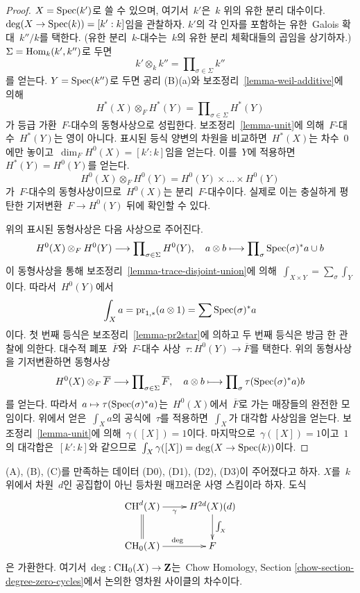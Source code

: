 \begin{proof}
$X = \mathop{\mathrm{Spec}}(k')$로 쓸 수 있으며, 여기서\  $k'$은\  $k$ 위의 유한 분리
대수이다. $\deg(X \to \mathop{\mathrm{Spec}}(k)) = [k' : k]$임을 관찰하자.
$k'$의 각 인자를 포함하는 유한\  Galois 확대\  $k''/k$를 택한다.
(유한 분리\  $k$-대수는\  $k$의 유한 분리 체확대들의 곱임을 상기하자.)
$\Sigma = \mathop{\mathrm{Hom}}\nolimits_k(k', k'')$로 두면
$$
k' \otimes_k k'' = \prod\nolimits_{\sigma \in \Sigma} k''
$$
를 얻는다. $Y = \mathop{\mathrm{Spec}}(k'')$로 두면 공리 (B)(a)와 보조정리\ 
\ref{lemma-weil-additive}에 의해
$$
H^*(X) \otimes_F H^*(Y) =
\prod\nolimits_{\sigma \in \Sigma} H^*(Y)
$$
가 등급 가환\  $F$-대수의 동형사상으로 성립한다. 보조정리\ 
\ref{lemma-unit}에 의해\  $F$-대수\  $H^*(Y)$는 영이 아니다.
표시된 등식 양변의 차원을 비교하면\  $H^*(X)$는 차수\  $0$에만 놓이고\ 
$\dim_F H^0(X) = [k' : k]$임을 얻는다. 이를\  $Y$에 적용하면\ 
$H^*(Y) = H^0(Y)$를 얻는다.
$$
H^0(X) \otimes_F H^0(Y) = H^0(Y) \times \ldots \times H^0(Y)
$$
가\  $F$-대수의 동형사상이므로\  $H^0(X)$는 분리\  $F$-대수이다. 실제로
이는 충실하게 평탄한 기저변환\  $F \to H^0(Y)$ 뒤에 확인할 수 있다.

\medskip\noindent
위의 표시된 동형사상은 다음 사상으로 주어진다.
$$
H^0(X) \otimes_F H^0(Y) \longrightarrow
\prod\nolimits_{\sigma \in \Sigma} H^0(Y),\quad
a \otimes b \longmapsto \prod\nolimits_\sigma \mathop{\mathrm{Spec}}(\sigma)^*a \cup b
$$
이 동형사상을 통해 보조정리\  \ref{lemma-trace-disjoint-union}에 의해\ 
$\int_{X \times Y} = \sum_\sigma \int_Y$이다. 따라서\  $H^0(Y)$에서
$$
\int_X a = \text{pr}_{1, *}(a \otimes 1) = \sum \mathop{\mathrm{Spec}}(\sigma)^*a
$$
이다. 첫 번째 등식은 보조정리\  \ref{lemma-pr2star}에 의하고 두 번째
등식은 방금 한 관찰에 의한다. 대수적 폐포\  $\overline{F}$와\ 
$F$-대수 사상\  $\tau : H^0(Y) \to \overline{F}$를 택한다. 위의
동형사상을 기저변환하면 동형사상
$$
H^0(X) \otimes_F \overline{F} \longrightarrow
\prod\nolimits_{\sigma \in \Sigma} \overline{F},\quad
a \otimes b \longmapsto \prod\nolimits_\sigma \tau(\mathop{\mathrm{Spec}}(\sigma)^*a) b
$$
를 얻는다. 따라서\  $a \mapsto \tau(\mathop{\mathrm{Spec}}(\sigma)^*a)$는\ 
$H^0(X)$에서\  $\overline{F}$로 가는 매장들의 완전한 모임이다.
위에서 얻은\  $\int_X a$의 공식에\  $\tau$를 적용하면\  $\int_X$가
대각합 사상임을 얻는다. 보조정리\  \ref{lemma-unit}에 의해\ 
$\gamma([X]) = 1$이다. 마지막으로\  $\gamma([X]) = 1$이고\  $1$의
대각합은\  $[k' : k]$와 같으므로\ 
$\int_X \gamma([X]) = \deg(X \to \mathop{\mathrm{Spec}}(k))$이다.
\end{proof}

\begin{lemma}
\label{lemma-degrees-cycles}
(A), (B), (C)를 만족하는 데이터 (D0), (D1), (D2), (D3)이
주어졌다고 하자. $X$를\  $k$ 위에서 차원\  $d$인 공집합이 아닌 등차원
매끄러운 사영 스킴이라 하자. 도식
$$
\xymatrix{
\CH^d(X) \ar[r]_-\gamma \ar@{=}[d] &
H^{2d}(X)(d) \ar[d]^{\int_X} \\
\CH_0(X) \ar[r]^\deg & F
}
$$
은 가환한다. 여기서\  $\deg : \mathop{\mathrm{CH}}\nolimits_0(X) \to \mathbf{Z}$는\  Chow
Homology, Section \ref{chow-section-degree-zero-cycles}에서 논의한
영차원 사이클의 차수이다.
\end{lemma}

